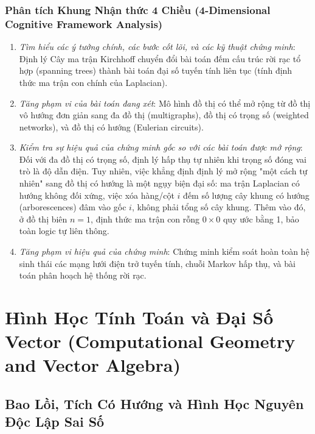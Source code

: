 \documentclass{article}
\begin{document}
\subsubsection*{Phân tích Khung Nhận thức 4 Chiều (4-Dimensional Cognitive Framework Analysis)}
\begin{enumerate}
 \item \textit{Tìm hiểu các ý tưởng chính, các bước cốt lõi, và các kỹ thuật chứng minh}: Định lý Cây ma trận Kirchhoff chuyển đổi bài toán đếm cấu trúc rời rạc tổ hợp (spanning trees) thành bài toán đại số tuyến tính liên tục (tính định thức ma trận con chính của Laplacian).
 \item \textit{Tăng phạm vi của bài toán đang xét}: Mô hình đồ thị có thể mở rộng từ đồ thị vô hướng đơn giản sang đa đồ thị (multigraphs), đồ thị có trọng số (weighted networks), và đồ thị có hướng (Eulerian circuits).
 \item \textit{Kiểm tra sự hiệu quả của chứng minh gốc so với các bài toán được mở rộng}: Đối với đa đồ thị có trọng số, định lý hấp thụ tự nhiên khi trọng số đóng vai trò là độ dẫn điện. Tuy nhiên, việc khẳng định định lý mở rộng "một cách tự nhiên" sang đồ thị có hướng là một ngụy biện đại số: ma trận Laplacian có hướng không đối xứng, việc xóa hàng/cột $i$ đếm số lượng cây khung có hướng (arborescences) đâm vào gốc $i$, không phải tổng số cây khung. Thêm vào đó, ở đồ thị biên $n=1$, định thức ma trận con rỗng $0 \times 0$ quy ước bằng 1, bảo toàn logic tự liên thông.
 \item \textit{Tăng phạm vi hiệu quả của chứng minh}: Chứng minh kiểm soát hoàn toàn hệ sinh thái các mạng lưới điện trở tuyến tính, chuỗi Markov hấp thụ, và bài toán phân hoạch hệ thống rời rạc.
\end{enumerate}



\section{Hình Học Tính Toán và Đại Số Vector (Computational Geometry and Vector Algebra)}
\subsection{Bao Lồi, Tích Có Hướng và Hình Học Nguyên Độc Lập Sai Số}
\end{document}
